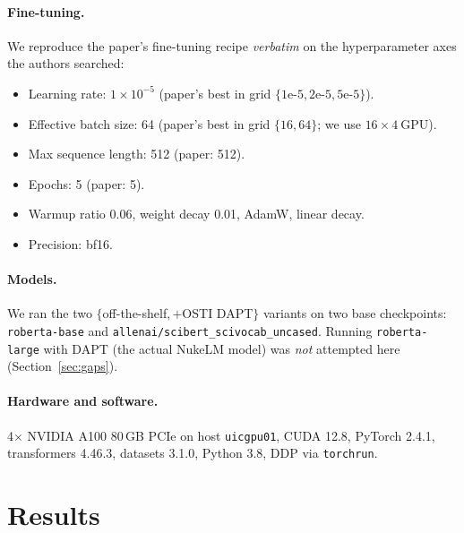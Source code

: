\documentclass[11pt]{article}
\begin{document}
\paragraph{Fine-tuning.} We reproduce the paper's fine-tuning recipe \emph{verbatim} on the hyperparameter axes the authors searched:
\begin{itemize}
  \item Learning rate: $1 \times 10^{-5}$ (paper's best in grid $\{1\text{e-}5, 2\text{e-}5, 5\text{e-}5\}$).
  \item Effective batch size: 64 (paper's best in grid $\{16, 64\}$; we use $16 \times 4~\text{GPU}$).
  \item Max sequence length: 512 (paper: 512).
  \item Epochs: 5 (paper: 5).
  \item Warmup ratio 0.06, weight decay 0.01, AdamW, linear decay.
  \item Precision: bf16.
\end{itemize}

\paragraph{Models.} We ran the two $\{$off-the-shelf$, +$OSTI DAPT$\}$ variants on two base checkpoints: \texttt{roberta-base} and \texttt{allenai/scibert\_scivocab\_uncased}. Running \texttt{roberta-large} with DAPT (the actual NukeLM model) was \emph{not} attempted here (Section~\ref{sec:gaps}).

\paragraph{Hardware and software.} 4$\times$ NVIDIA A100 80\,GB PCIe on host \texttt{uicgpu01}, CUDA 12.8, PyTorch 2.4.1, transformers 4.46.3, datasets 3.1.0, Python 3.8, DDP via \texttt{torchrun}.

\section{Results}
\end{document}

